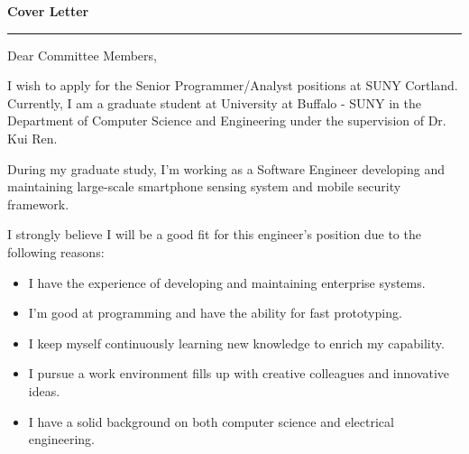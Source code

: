 \documentclass[11pt]{letter} %
\begin{document}

\begin{letter}{} 



\begin{center}
\Large\bf Cover Letter %
\vspace{20pt} \hrule height 1pt %
\end{center} 

\signature{Si Chen\\
Department of Computer Science and Engineering\\
University at Buffalo - SUNY\\
301 Davis Hall, Buffalo NY\\
(716) 335-8052} %


\opening{Dear Committee Members,} 
 
I wish to apply for the Senior Programmer/Analyst positions at SUNY Cortland. Currently, I am a graduate student at University at Buffalo - SUNY in the Department of Computer Science and Engineering under the supervision of Dr. Kui Ren. 

During my graduate study, I'm working as a Software Engineer developing and maintaining large-scale smartphone sensing system and mobile security framework. 

I strongly believe I will be a good fit for this engineer's position due to the following reasons:
\begin{itemize}
\item I have the experience of developing and maintaining enterprise systems.
\item I'm good at programming and have the ability for fast prototyping. 
\item I keep myself continuously learning new knowledge to enrich my capability.
\item I pursue a work environment fills up with creative colleagues and innovative ideas.
\item I have a solid background on both computer science and electrical engineering.


\end{itemize}
\end{letter}
\end{document}
